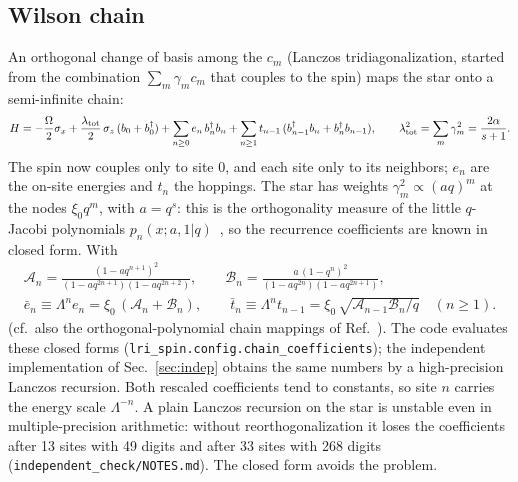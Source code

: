 \documentclass[10pt,a4paper]{article}
\newcommand{\code}[1]{\texttt{#1}}
\begin{document}
\subsection{Wilson chain}
An orthogonal change of basis among the $c_m$ (Lanczos tridiagonalization, started from the combination $\sum_m\gamma_mc_m$ that
couples to the spin) maps the star onto a semi-infinite chain:
\begin{equation}
H=-\frac{\Omega}{2}\sigma_x+\frac{\lambda_{\rm tot}}{2}\,\sigma_z\,(b_0+b_0^\dagger)+\sum_{n\ge0}e_n\, b_n^\dagger b_n
+\sum_{n\ge1}t_{n-1}\,(b_{n-1}^\dagger b_n+b_n^\dagger b_{n-1}),\qquad \lambda_{\rm tot}^2=\sum_m\gamma_m^2=\frac{2\alpha}{s+1}.
\label{eq:chain}
\end{equation}
The spin now couples only to site 0, and each site only to its neighbors; $e_n$ are the on-site energies and $t_n$ the hoppings. The
star has weights $\gamma_m^2\propto(aq)^m$ at the nodes $\xi_0q^m$, with $a=q^s$: this is the orthogonality measure of the little
$q$-Jacobi polynomials $p_n(x;a,1|q)$~\cite{KLS10}, so the recurrence coefficients are known in closed form. With
\begin{gather}
\mathcal A_n=\frac{(1-aq^{n+1})^2}{(1-aq^{2n+1})(1-aq^{2n+2})},\qquad
\mathcal B_n=\frac{a\,(1-q^n)^2}{(1-aq^{2n})(1-aq^{2n+1})},\nonumber\\
\bar e_n\equiv\Lambda^{n}e_n=\xi_0\,(\mathcal A_n+\mathcal B_n),\qquad
\bar t_n\equiv\Lambda^{n}t_{n-1}=\xi_0\,\sqrt{\mathcal A_{n-1}\mathcal B_n/q}\quad(n\ge1).\label{eq:coeff}
\end{gather}
(cf.\ also the orthogonal-polynomial chain mappings of Ref.~\cite{Chin2010}). The code evaluates these closed forms
(\code{lri\_spin.config.chain\_coefficients}); the independent implementation of Sec.~\ref{sec:indep} obtains the same numbers by a
high-precision Lanczos recursion. Both rescaled coefficients tend to constants, so site $n$ carries the energy scale $\Lambda^{-n}$.
A plain Lanczos recursion on the star is unstable even in multiple-precision arithmetic: without reorthogonalization it loses the
coefficients after 13 sites with 49 digits and after 33 sites with 268 digits (\code{independent\_check/NOTES.md}). The closed form
avoids the problem.
\end{document}
